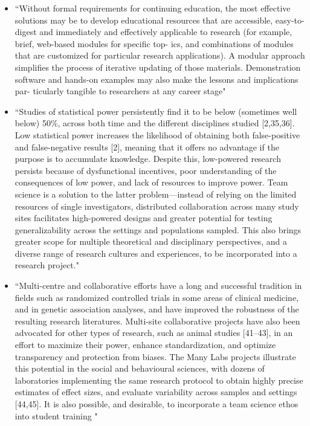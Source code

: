 \documentclass[pdftex,english,11pt,parskip=half]{scrartcl}
\begin{document}
\begin{itemize}
\item ``Without formal requirements for continuing education, the most effective solutions may be to develop educational resources that are accessible, easy-to-digest and immediately and effectively applicable to research (for example, brief, web-based modules for specific top- ics, and combinations of modules that are customized for particular research applications). A modular approach simplifies the process of iterative updating of those materials. Demonstration software and hands-on examples may also make the lessons and implications par- ticularly tangible to researchers at any career stage" \cite{munafo2017manifesto}\item ``Studies of statistical power persistently find it to be below (sometimes well below) 50\%, across both time and the different disciplines studied [2,35,36]. Low statistical power increases the likelihood of obtaining both false-positive and false-negative results [2], meaning that it offers no advantage if the purpose is to accumulate knowledge. Despite this, low-powered research persists because of dysfunctional incentives, poor understanding of the consequences of low power, and lack of resources to improve power. Team science is a solution to the latter problem---instead of relying on the limited resources of single investigators, distributed collaboration across many study sites facilitates high-powered designs and greater potential for testing generalizability across the settings and populations sampled. This also brings greater scope for multiple theoretical and disciplinary perspectives, and a diverse range of research cultures and experiences, to be incorporated into a research project." \cite{munafo2017manifesto}
\item ``Multi-centre and collaborative efforts have a long and successful tradition in fields such as randomized controlled trials in some areas of clinical medicine, and in genetic association analyses, and have improved the robustness of the resulting research literatures. Multi-site collaborative projects have also been advocated for other types of research, such as animal studies [41--43], in an effort to maximize their power, enhance standardization, and optimize transparency and protection from biases. The Many Labs projects illustrate this potential in the social and behavioural sciences, with dozens of laboratories implementing the same research protocol to obtain highly precise estimates of effect sizes, and evaluate variability across samples and settings [44,45]. It is also possible, and desirable, to incorporate a team science ethos into student training " \cite{munafo2017manifesto}

\end{itemize}
\end{document}
